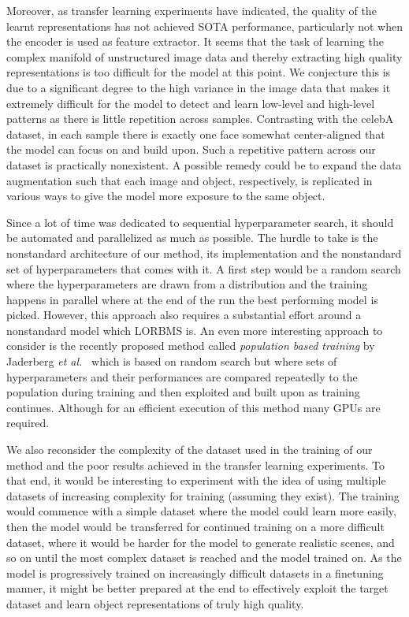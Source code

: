 \documentclass[a4paper,12pt]{report}
\begin{document}
Moreover, as transfer learning experiments have indicated, the quality of the learnt representations has not achieved SOTA performance, particularly not when the encoder is used as feature extractor. It seems that the task of learning the complex manifold of unstructured image data and thereby extracting high quality representations is too difficult for the model at this point. We conjecture this is due to a significant degree to the high variance in the image data that makes it extremely difficult for the model to detect and learn low-level and high-level patterns as there is little repetition across samples. Contrasting with the celebA dataset, in each sample there is exactly one face somewhat center-aligned that the model can focus on and build upon. Such a repetitive pattern across our dataset is practically nonexistent. A possible remedy could be to expand the data augmentation such that each image and object, respectively, is replicated in various ways to give the model more exposure to the same object.

Since a lot of time was dedicated to sequential hyperparameter search, it should be automated and parallelized as much as possible. The hurdle to take is the nonstandard architecture of our method, its implementation and the nonstandard set of hyperparameters that comes with it. A first step would be a random search where the hyperparameters are drawn from a distribution and the training happens in parallel where at the end of the run the best performing model is picked. However, this approach also requires a substantial effort around a nonstandard model which LORBMS is. An even more interesting approach to consider is the recently proposed method called \textit{population based training} by Jaderberg \textit{et al.}~\cite{PopBasedTraining} which is based on random search but where sets of hyperparameters and their performances are compared repeatedly to the population during training and then exploited and built upon as training continues. Although for an efficient execution of this method many GPUs are required. 

We also reconsider the complexity of the dataset used in the training of our method and the poor results achieved in the transfer learning experiments. To that end, it would be interesting to experiment with the idea of using multiple datasets of increasing complexity for training (assuming they exist). The training would commence with a simple dataset where the model could learn more easily, then the model would be transferred for continued training on a more difficult dataset, where it would be harder for the model to generate realistic scenes, and so on until the most complex dataset is reached and the model trained on. As the model is progressively trained on increasingly difficult datasets in a finetuning manner, it might be better prepared at the end to effectively exploit the target dataset and learn object representations of truly high quality.
\end{document}
